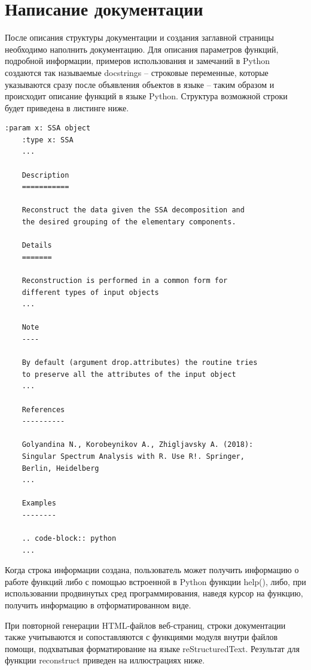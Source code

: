 \documentclass[specialist,
			   substylefile = spbu_report.rtx,
			   subf,href,colorlinks=true, 12pt]{disser}
\begin{document}
\section{Написание документации}

После описания структуры документации и создания заглавной страницы необходимо наполнить документацию. Для описания параметров функций, подробной информации, примеров использования и замечаний в Python создаются так называемые docstrings \cite{docstring-doc} – строковые переменные, которые указываются сразу после объявления объектов в языке – таким образом и происходит описание функций в языке Python. Структура возможной строки будет приведена в листинге ниже.

\begin{lstlisting}[language=RsT, caption=Сокращенное содержание docstring для функции reconstruct.]
	:param x: SSA object
	:type x: SSA
	...
	
	Description
	===========
	
	Reconstruct the data given the SSA decomposition and 
	the desired grouping of the elementary components.
	
	Details
	=======
	
	Reconstruction is performed in a common form for 
	different types of input objects
	...
	
	Note
	----
	
	By default (argument drop.attributes) the routine tries 
	to preserve all the attributes of the input object
	...
	
	References
	----------
	
	Golyandina N., Korobeynikov A., Zhigljavsky A. (2018): 
	Singular Spectrum Analysis with R. Use R!. Springer,
	Berlin, Heidelberg
	...
	
	Examples
	--------
	
	.. code-block:: python
	...
\end{lstlisting}

Когда строка информации создана, пользователь может получить информацию о работе функций либо с помощью встроенной в Python функции help(), либо, при использовании продвинутых сред программирования, наведя курсор на функцию, получить информацию в отформатированном виде.

При повторной генерации HTML-файлов веб-страниц, строки документации также учитываются и сопоставляются с функциями модуля внутри файлов помощи, подхватывая форматирование на языке reStructuredText. Результат для функции reconstruct приведен на иллюстрациях ниже.
\end{document}
